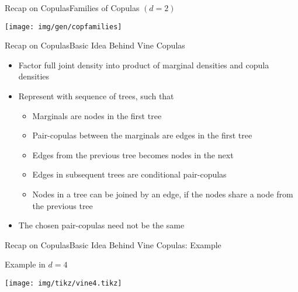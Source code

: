 \begin{frame}{Recap on Copulas}{Families of Copulas \((d=2)\)}
  \begin{center}
    \texttt{[image: img/gen/copfamilies]}
  \end{center}
\end{frame}

\begin{frame}{Recap on Copulas}{Basic Idea Behind Vine Copulas}
  \begin{itemize}
  \item<2-> Factor full joint density into product of marginal densities and copula densities
  \item<3-> Represent with sequence of trees, such that
    \begin{itemize}
    \item Marginals are nodes in the first tree
    \item Pair-copulas between the marginals are edges in the first tree
    \item Edges from the previous tree becomes nodes in the next
    \item Edges in subsequent trees are conditional pair-copulas
    \item Nodes in a tree can be joined by an edge, if the nodes share a node from the previous tree
    \end{itemize}
  \item<4-> The chosen pair-copulas need not be the same
  \end{itemize}
\end{frame}

\begin{frame}{Recap on Copulas}{Basic Idea Behind Vine Copulas: Example}
  \begin{block}{Example in \(d = 4\)}
    \begin{center}
      \texttt{[image: img/tikz/vine4.tikz]}
    \end{center}
  \end{block}
\end{frame}


